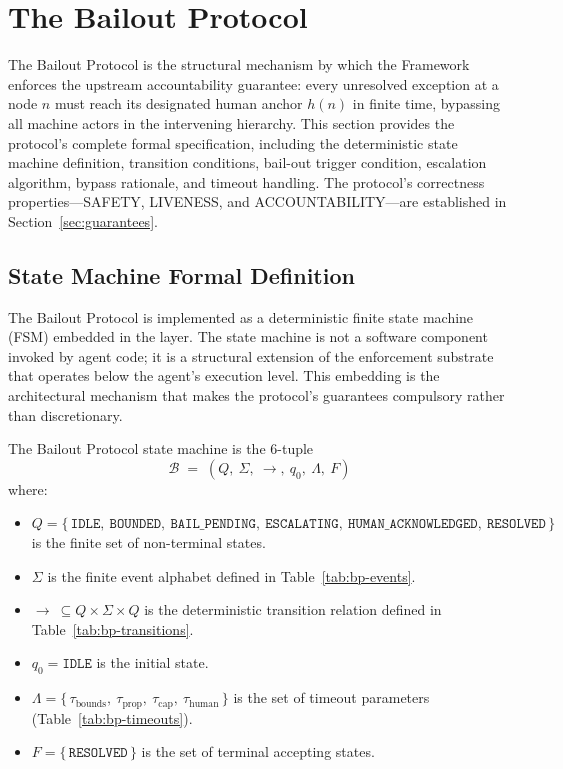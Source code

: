 \section{The Bailout Protocol}
\label{sec:bailout-protocol}

The Bailout Protocol is the structural mechanism by which the \bxthree{} Framework enforces the upstream accountability guarantee: every unresolved exception at a node $n$ must reach its designated human anchor $h(n)$ in finite time, bypassing all machine actors in the intervening hierarchy. This section provides the protocol's complete formal specification, including the deterministic state machine definition, transition conditions, bail-out trigger condition, escalation algorithm, bypass rationale, and timeout handling. The protocol's correctness properties---SAFETY, LIVENESS, and ACCOUNTABILITY---are established in Section~\ref{sec:guarantees}.

\subsection{State Machine Formal Definition}
\label{sec:bp-state-machine}

The Bailout Protocol is implemented as a deterministic finite state machine (FSM) embedded in the \fact{} layer. The state machine is not a software component invoked by agent code; it is a structural extension of the enforcement substrate that operates below the agent's execution level. This embedding is the architectural mechanism that makes the protocol's guarantees compulsory rather than discretionary.

\begin{definition}
\label{def:bp-state-machine}
The Bailout Protocol state machine is the 6-tuple
\[
\mathcal{B} \;=\; (Q,\ \Sigma,\ \rightarrow,\ q_0,\ \Lambda,\ F)
\]
where:
\begin{itemize}\itemsep=0pt
\item $Q = \{\,\texttt{IDLE},\ \texttt{BOUNDED},\ \texttt{BAIL\_PENDING},\ \texttt{ESCALATING},\ \texttt{HUMAN\_ACKNOWLEDGED},\ \texttt{RESOLVED}\,\}$ is the finite set of non-terminal states.
\item $\Sigma$ is the finite event alphabet defined in Table~\ref{tab:bp-events}.
\item $\rightarrow\ \subseteq Q \times \Sigma \times Q$ is the deterministic transition relation defined in Table~\ref{tab:bp-transitions}.
\item $q_0 = \texttt{IDLE}$ is the initial state.
\item $\Lambda = \{\,\tau_{\text{bounds}},\ \tau_{\text{prop}},\ \tau_{\text{cap}},\ \tau_{\text{human}}\,\}$ is the set of timeout parameters (Table~\ref{tab:bp-timeouts}).
\item $F = \{\,\texttt{RESOLVED}\,\}$ is the set of terminal accepting states.
\end{itemize}
\end{definition}


